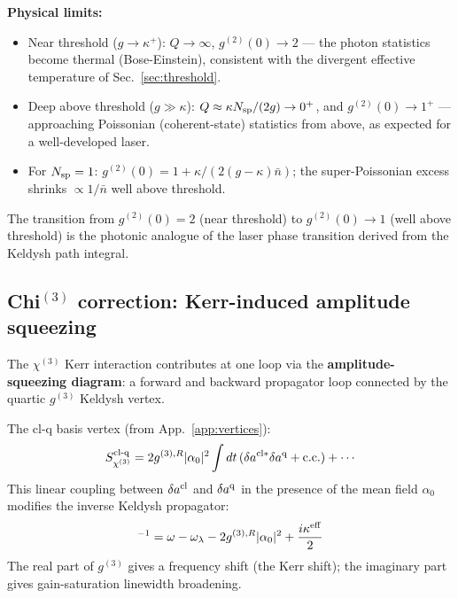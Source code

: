 \documentclass[12pt]{article}
\newcommand{\cl}{{\rm cl}}
\newcommand{\q}{{\rm q}}
\begin{document}
\textbf{Physical limits:}
\begin{itemize}
  \item Near threshold ($g\to\kappa^+$): $Q\to\infty$, $g^{(2)}(0)\to 2$
    --- the photon statistics become thermal (Bose-Einstein), consistent with
    the divergent effective temperature of Sec.~\ref{sec:threshold}.
  \item Deep above threshold ($g\gg\kappa$):
    $Q\approx\kappa N_{\rm sp}/(2g)\to 0^+$, and
    $g^{(2)}(0)\to 1^+$
    --- approaching Poissonian (coherent-state) statistics from above,
    as expected for a well-developed laser.
  \item For $N_{\rm sp} = 1$: $g^{(2)}(0) = 1 + \kappa/(2(g-\kappa)\bar{n})$;
    the super-Poissonian excess shrinks $\propto 1/\bar{n}$ well above threshold.
\end{itemize}

The transition from $g^{(2)}(0)=2$ (near threshold) to $g^{(2)}(0)\to 1$
(well above threshold) is the photonic analogue of the laser phase transition
derived from the Keldysh path integral.

\subsection{Chi\texorpdfstring{$^{(3)}$}{(3)} correction:
Kerr-induced amplitude squeezing}
\label{sec:chi3_stats}

The $\chi^{(3)}$ Kerr interaction contributes at one loop via the
\textbf{amplitude-squeezing diagram}: a forward and backward propagator
loop connected by the quartic $g^{(3)}$ Keldysh vertex.

The cl-q basis vertex (from App.~\ref{app:vertices}):
\begin{equation}
  S_{\chi^{(3)}}^{{\rm cl}\text{-}{\rm q}} =
  2g^{(3),R}|\alpha_0|^2\int dt\,
  (\delta a^{\cl*}\delta a^\q + \mathrm{c.c.})
  + \cdots
  \label{eq:chi3_clq_vertex}
\end{equation}
This linear coupling between $\delta a^\cl$ and $\delta a^\q$ in the
presence of the mean field $\alpha_0$ modifies the inverse Keldysh propagator:
\begin{equation}
  [G^R_{\chi^{(3)}}(\omega)]^{-1} =
  \omega - \omega_\lambda - 2g^{(3),R}|\alpha_0|^2
  + \frac{i\kappa^{\rm eff}}{2}
  \label{eq:Kerr_shift}
\end{equation}
The real part of $g^{(3)}$ gives a frequency shift (the Kerr shift);
the imaginary part gives gain-saturation linewidth broadening.
\end{document}
